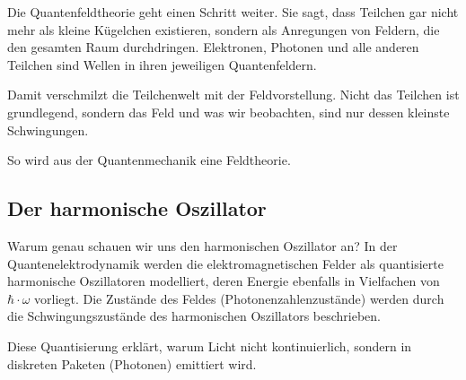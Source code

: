 	Die Quantenfeldtheorie geht einen Schritt weiter.
	Sie sagt, dass Teilchen gar nicht mehr als kleine Kügelchen existieren, sondern als Anregungen von Feldern, die den gesamten Raum durchdringen. 
	Elektronen, Photonen und alle anderen Teilchen sind Wellen in ihren jeweiligen Quantenfeldern.
	
	Damit verschmilzt die Teilchenwelt mit der Feldvorstellung.
	Nicht das Teilchen ist grundlegend, sondern das Feld und was wir beobachten, sind nur dessen kleinste Schwingungen.
	
	So wird aus der Quantenmechanik eine Feldtheorie.
	
	
	
	
	
	
	
	
	
	
	
	
	
	
	
	
\subsection{Der harmonische Oszillator\label{fourier:subsection:derHarmonischeOszillator}}

Warum genau schauen wir uns den harmonischen Oszillator an?
In der Quantenelektrodynamik werden die elektromagnetischen Felder als quantisierte harmonische Oszillatoren modelliert, deren Energie ebenfalls in Vielfachen von $\hbar\cdot\omega$ vorliegt.
Die Zustände des Feldes (Photonenzahlenzustände) werden durch die Schwingungszustände des harmonischen Oszillators beschrieben.

Diese Quantisierung erklärt, warum Licht nicht kontinuierlich, sondern in diskreten Paketen (Photonen) emittiert wird. %

